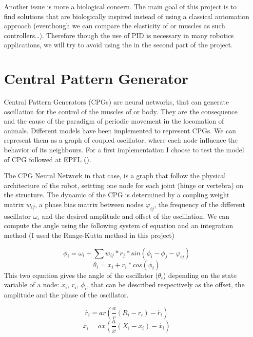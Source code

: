 Another issue is more a biological concern. The main goal of this project is to find solutions that are biologically inspired instead of using a classical automation approach (eventhough we can compare the elasticity of or muscles as such controllers\ldots). Therefore though the use of PID is necessary in many robotics applications, we will try to avoid using the in the second part of the project. 

\section{Central Pattern Generator}

Central Pattern Generators (CPGs) are neural networks, that can generate oscillation for the control of the muscles of or body. They are the consequence and the cause of the paradigm of periodic movement in the locomation of animals. Different models have been implemented to represent CPGs. We can represent them as a graph of coupled oscillator, where each node influence the behavior of its neighbours. For a first implementation I choose to test the model of CPG followed at EPFL (\cite{sproewitz}). 

The CPG Neural Network in that case, is a graph that follow the physical architecture of the robot, settting one node for each joint (hinge or vertebra) on the structure. The dynamic of the CPG is determined by a coupling weight matrix $w_{ij}$, a phase bias matrix between nodes $\varphi_{ij}$, the frequency of the different oscillator $\omega_i$ and the desired amplitude and offset of the oscillation. We can compute the angle using the following system of equation and an integration method (I used the Runge-Kutta method in this project)

\begin{equation*}
    \dot{\phi_i} = \omega_i + \sum{w_{ij} * r_j * sin(\phi_i - \phi_j - \varphi_{ij})} \tag{1}
\end{equation*}
\begin{equation*}
        \theta_i = x_i + r_i * cos(\phi_i)  \tag{2}
\end{equation*}
This two equation gives the angle of the oscillator ($\theta_i$) depending on the state variable of a node: $x_i$, $r_i$, $\phi_i$, that can be described respectively as the offset, the amplitude and the phase of the oscillator.

\begin{equation*}
    \acute{r_i} = ar(\frac ar (R_i - r_i) - \dot{r_i}) \tag{3}
\end{equation*}
\begin{equation*}
    \acute{x_i} = ax(\frac ax (X_i - x_i) - \dot{x_i}) \tag{4}
\end{equation*}

